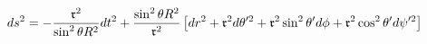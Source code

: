 \begin{equation*}
ds^{2}=-\frac{\frak{r}^{2}}{\sin ^{2}\theta R^{2}}dt^{2}+\frac{\sin
^{2}\theta R^{2}}{\frak{r}^{2}}\left[ dr^{2}+\frak{r}^{2}d\theta ^{\prime 2}+%
\frak{r}^{2}\sin ^{2}\theta ^{\prime }d\phi +\frak{r}^{2}\cos ^{2}\theta
^{\prime }d\psi ^{\prime 2}\right]
\end{equation*}

